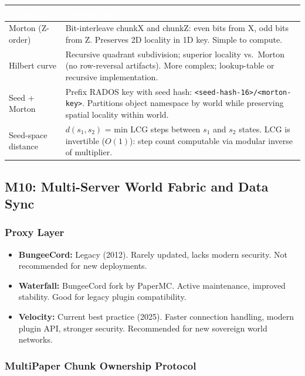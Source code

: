 \documentclass[11pt,letterpaper]{article}
\newcommand{\tableheader}[1]{\textbf{\sffamily\textcolor{white}{#1}}}
\begin{document}
\begin{center}
\begin{tabularx}{\textwidth}{L{3.5cm}X}
\toprule
{}
\tableheader{Mapping} & \tableheader{Description} \\
\midrule
Morton (Z-order) & Bit-interleave chunkX and chunkZ: even bits from X, odd bits from Z. Preserves 2D locality in 1D key. Simple to compute. \\
Hilbert curve & Recursive quadrant subdivision; superior locality vs.\ Morton (no row-reversal artifacts). More complex; lookup-table or recursive implementation. \\
Seed + Morton & Prefix RADOS key with seed hash: \texttt{<seed-hash-16>/<morton-key>}. Partitions object namespace by world while preserving spatial locality within world. \\
Seed-space distance & $d(s_1, s_2)$ = min LCG steps between $s_1$ and $s_2$ states. LCG is invertible ($O(1)$): step count computable via modular inverse of multiplier. \\
\bottomrule
\end{tabularx}
\end{center}

\subsection{M10: Multi-Server World Fabric and Data Sync}

\subsubsection{Proxy Layer}

\begin{itemize}[leftmargin=2em]
  \item \textbf{BungeeCord:} Legacy (2012). Rarely updated, lacks modern security. Not recommended for new deployments.
  \item \textbf{Waterfall:} BungeeCord fork by PaperMC. Active maintenance, improved stability. Good for legacy plugin compatibility.
  \item \textbf{Velocity:} Current best practice (2025). Faster connection handling, modern plugin API, stronger security. Recommended for new sovereign world networks.
\end{itemize}

\subsubsection{MultiPaper Chunk Ownership Protocol}
\end{document}
